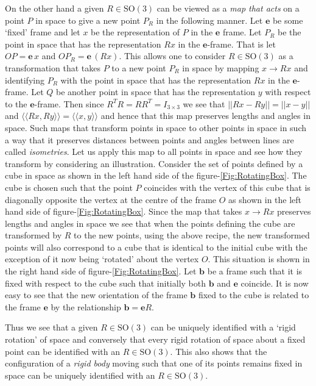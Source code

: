 \documentclass[graybox,envcountchap,sectrefs]{svmonoMuga}
\begin{document}
On the other hand a given $R\in \mathrm{SO}(3)$ 
can be viewed as a \textit{map that acts} on a point $P$ in space to give a new point $P_R$ in the following manner. Let $\mathbf{e}$ be some `fixed' frame and let $x$ be the representation of $P$ in the $\mathbf{e}$ frame. 
Let $P_R$ be the point in space that has the representation $Rx$ in the $\mathbf{e}$-frame. That is let $OP=\mathbf{e}\, x$ and $OP_R=\mathbf{e}\,(R x)$.
This allows one to  consider $R\in \mathrm{SO}(3)$ as a transformation that  takes $P$ to a new point $P_R$ in space by mapping $x \to Rx$ and identifying $P_R$ with the point in space that has the representation $Rx$ in the $\mathbf{e}$-frame. Let $Q$ be another point in space that has the representation $y$ with respect to the $\mathbf{e}$-frame. Then since $R^TR=RR^T=I_{3\times 3}$ we see that $||Rx-Ry||=||x-y||$ and $\langle\langle Rx,Ry\rangle\rangle=\langle\langle x,y\rangle\rangle$  and hence that this map preserves lengths and angles in space. Such maps that transform points in space to other points in space in such a way that it preserves distances between points and angles between lines are called \textit{isometries}. Let us apply this map to all points in space and see how they transform by considering an illustration.
Consider the set of points defined by a cube in space as shown in the left hand side of the figure-\ref{Fig:RotatingBox}. The cube is chosen such that the point $P$ coincides with the vertex of this cube that is diagonally opposite the vertex at the centre of the frame $O$ as shown in the left hand side of figure-\ref{Fig:RotatingBox}. 
Since the map that takes $x \to Rx$ preserves lengths and angles in space we see that when the points defining the cube are transformed by $R$ to the new points, using the above recipe,  the new transformed points will also correspond to a cube that is identical to the initial cube with the exception of it now being `rotated' about the vertex $O$. This situation is shown in the right hand side of figure-\ref{Fig:RotatingBox}. Let $\mathbf{b}$ be a frame such that it is fixed with respect to the cube such that initially both $\mathbf{b}$ and $\mathbf{e}$ coincide. It is now easy to see that the new orientation of the frame $\mathbf{b}$ fixed to the cube is related to the frame $\mathbf{e}$ by the relationship $\mathbf{b}=\mathbf{e}R$. 
\begin{svgraybox}
Thus we see that a given $R\in \mathrm{SO}(3)$ can be uniquely identified with a `rigid rotation' of space and conversely that every rigid rotation of space about a fixed point can be identified with an $R\in \mathrm{SO}(3)$. This also shows that the configuration of a \textit{rigid body} moving such that one of its points remains fixed in space can be uniquely identified with an $R\in \mathrm{SO}(3)$.
\end{svgraybox}
\end{document}
